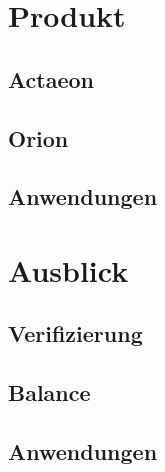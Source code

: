 \documentclass[11pt]{article}
\begin{document}
\section{Produkt}
\label{sec:org172cd7d}
\subsection{Actaeon}
\label{sec:org5599127}
\subsection{Orion}
\label{sec:orgf2ce77b}
\subsection{Anwendungen}
\label{sec:org2e73250}
\section{Ausblick}
\label{sec:org756ee4c}
\subsection{Verifizierung}
\label{sec:org41f1364}
\subsection{Balance}
\label{sec:orgfae338c}
\subsection{Anwendungen}
\label{sec:org58282e8}
\end{document}
